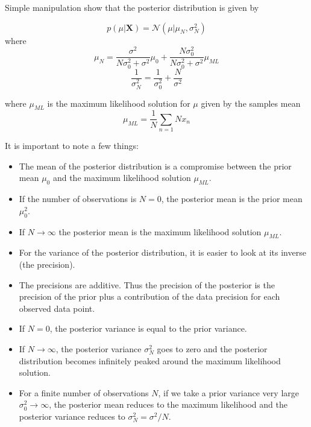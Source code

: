 Simple manipulation show that the posterior distribution is given by

\begin{equation}
    p(\mu | \boldsymbol{X}) = \mathcal{N}(\mu | \mu_N, \sigma_N^2)
\end{equation}
where
\begin{equation}
    \mu_N = \frac{\sigma^2}{N\sigma_0^2 + \sigma^2} \mu_0 + \frac{N\sigma_0^2}{N\sigma_0^2 + \sigma^2}\mu_{ML}
\end{equation}
\begin{equation}
    \frac{1}{\sigma_N^2} = \frac{1}{\sigma_0^2} + \frac{N}{\sigma^2}
\end{equation}

where $\mu_{ML}$ is the maximum likelihood solution for $\mu$ given by the samples mean
\begin{equation}
    \mu_{ML} = \frac{1}{N}\sum_{n=1}{N} x_n
\end{equation}

It is important to note a few things:
\begin{itemize}
    \item The mean of the posterior distribution is a compromise between the prior mean $\mu_0$ and the maximum likelihood solution $\mu_{ML}$.
    \item If the number of observations is $N = 0$, the posterior mean is the prior mean $\mu_0^2$.
    \item If $N \rightarrow \infty$ the posterior mean is the maximum likelihood solution $\mu_{ML}$.
    \item For the variance of the posterior distribution, it is easier to look at its inverse (the precision).
    \item The precisions are additive. Thus the precision of the posterior is the precision of the prior plus a contribution of the data precision for each observed data point.
    \item If $N = 0$, the posterior variance is equal to the prior variance.
    \item If $N \rightarrow \infty$, the posterior variance $\sigma_N^2$ goes to zero and the posterior distribution becomes infinitely peaked around the maximum likelihood solution.
    \item For a finite number of observations $N$, if we take a prior variance very large $\sigma_0^2 \rightarrow \infty$, the posterior mean reduces to the maximum likelihood and the posterior variance reduces to $\sigma_N^2 = \sigma^2/N$.
\end{itemize}